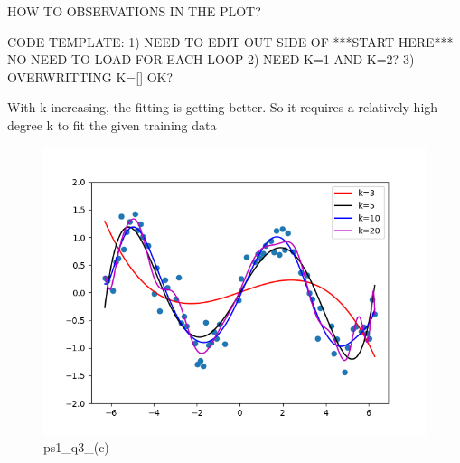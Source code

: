 \begin{answer}

HOW TO OBSERVATIONS IN THE PLOT?

CODE TEMPLATE: 1) NEED TO EDIT OUT SIDE OF ***START HERE*** NO NEED TO LOAD FOR EACH LOOP 2) NEED K=1 AND K=2? 3) OVERWRITTING K=[] OK?

With k increasing, the fitting is getting better. So it requires a relatively high degree k to fit the given training data
\begin{figure}
    \centering
    \includegraphics[width=0.5\linewidth]{ps1_q3_(c).png}
    \caption{ps1\_q3\_(c)}
    \label{fig:enter-label}
\end{figure}
\end{answer}
